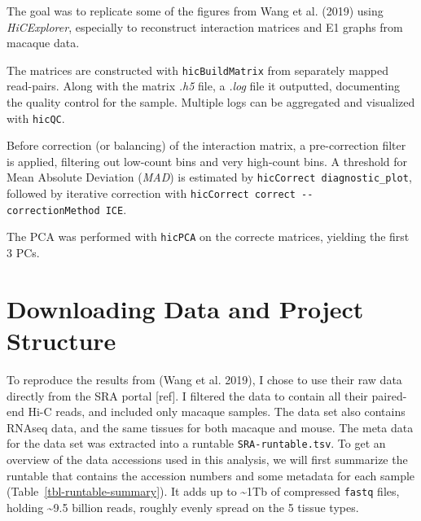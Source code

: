 \documentclass[
  11pt,
  a4paper,
]{scrbook}
\let\oldemph\emph
\renewcommand\emph[1]{\oldemph{\color{gray}#1}}
\begin{document}
\normalsize

The goal was to replicate some of the figures from Wang et al. (2019)
using \emph{HiCExplorer}, especially to reconstruct interaction matrices
and E1 graphs from macaque data.

The matrices are constructed with \texttt{hicBuildMatrix} from
separately mapped read-pairs. Along with the matrix \emph{.h5} file, a
\emph{.log} file it outputted, documenting the quality control for the
sample. Multiple logs can be aggregated and visualized with
\texttt{hicQC}.

Before correction (or balancing) of the interaction matrix, a
pre-correction filter is applied, filtering out low-count bins and very
high-count bins. A threshold for Mean Absolute Deviation (\emph{MAD}) is
estimated by \texttt{hicCorrect\ diagnostic\_plot}, followed by
iterative correction with
\texttt{hicCorrect\ correct\ -\/-correctionMethod\ ICE}.

The PCA was performed with \texttt{hicPCA} on the correcte matrices,
yielding the first 3 PCs.

\section{Downloading Data and Project
Structure}\label{downloading-data-and-project-structure}

To reproduce the results from (Wang et al. 2019), I chose to use their
raw data directly from the SRA portal {[}ref{]}. I filtered the data to
contain all their paired-end Hi-C reads, and included only macaque
samples. The data set also contains RNAseq data, and the same tissues
for both macaque and mouse. The meta data for the data set was extracted
into a runtable \texttt{SRA-runtable.tsv}. To get an overview of the
data accessions used in this analysis, we will first summarize the
runtable that contains the accession numbers and some metadata for each
sample (Table~\ref{tbl-runtable-summary}). It adds up to
\textasciitilde1Tb of compressed \texttt{fastq} files, holding
\textasciitilde9.5 billion reads, roughly evenly spread on the 5 tissue
types.

\small
\end{document}
